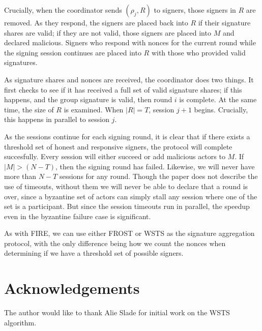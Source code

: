 \documentclass{article}
\theoremstyle{definition}
\theoremstyle{remark}
\begin{document}
Crucially, when the coordinator sends $(\rho_j, R)$ to signers, those signers in $R$ are removed.  As they respond, the signers are placed back into $R$ if their signature shares are valid; if they are not valid, those signers are placed into $M$ and declared malicious.  Signers who respond with nonces for the current round while the signing session continues are placed into $R$ with those who provided valid signatures.

As signature shares and nonces are received, the coordinator does two things.  It first checks to see if it has received a full set of valid signature shares; if this happens, and the group signature is valid, then round $i$ is complete.  At the same time, the size of $R$ is examined.  When $|R| = T$, session $j+1$ begins.  Crucially, this happens in parallel to session $j$.

As the sessions continue for each signing round, it is clear that if there exists a threshold set of honest and responsive signers, the protocol will complete succesfully.  Every session will either succeed or add malicious actors to $M$.  If $|M| > (N-T)$, then the signing round has failed.  Likewise, we will never have more than $N-T$ sessions for any round.  Though the paper does not describe the use of timeouts, without them we will never be able to declare that a round is over, since a byzantine set of actors can simply stall any session where one of the set is a participant.  But since the session timeouts run in parallel, the speedup even in the byzantine failure case is significant.

As with FIRE, we can use either FROST or WSTS as the signature aggregation protocol, with the only difference being how we count the nonces when determining if we have a threshold set of possible signers.

\section{
  Acknowledgements
}

The author would like to thank Alie Slade for initial work on the WSTS algorithm.
\end{document}
